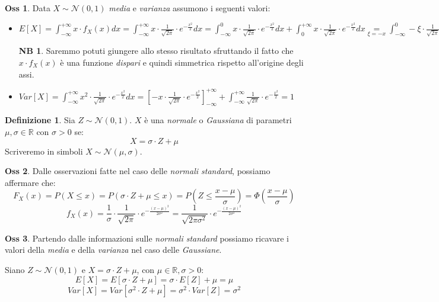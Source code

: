 \documentclass[12pt, a4paper]{report}
\theoremstyle{definition}
\newtheorem{definition}{Definizione}[section]
\newtheorem*{observation}{Oss}
\newtheorem*{note}{NB}
\DeclareRobustCommand{\R}{\mathbb{R}}%
\DeclareRobustCommand{\norm}{\mathcal{N}}
\newcommand\underrel[2]{\mathrel{\mathop{#2}\limits_{#1}}}%
\begin{document}
\begin{observation}
	Data $X\sim\norm(0,1)$ \emph{media} e \emph{varianza} assumono i seguenti valori:
	\begin{itemize}
		\item \(E[X]=\int_{-\infty}^{+\infty}x\cdot f_X(x)dx=\int_{-\infty}^{+\infty}
		x\cdot \frac{1}{\sqrt{2\pi}}\cdot e^{-\frac{x^2}{2}}dx=\int_{-\infty}^0x\cdot \frac{1}
		{\sqrt{2\pi}}\cdot e^{-\frac{x^2}{2}}dx+\int_0^{+\infty}x\cdot \frac{1}{\sqrt{2\pi}}
		\cdot e^{-\frac{x^2}{2}}dx\underrel{\xi=-x}{=}\int_{-\infty}^0 -\xi\cdot \frac{1}
		{\sqrt{2\pi}}\cdot e^{-\frac{x^2}{2}}dx+\int_0^{+\infty}x\cdot \frac{1}{\sqrt{2\pi}}
		\cdot e^{-\frac{x^2}{2}}=0\)
		\begin{note}
			Saremmo potuti giungere allo stesso risultato sfruttando il fatto che
			$x\cdot f_X(x)$ è una funzione \emph{dispari} e quindi simmetrica rispetto
			all'origine degli assi.
		\end{note}
		\item \(Var[X]=\int_{-\infty}^{+\infty}x^2\cdot \frac{1}{\sqrt{2\pi}}\cdot e^{-
		\frac{x^2}{2}}dx=\left[-x\cdot \frac{1}{\sqrt{2\pi}}\cdot e^{-\frac{x^2}{2}}\right]
		_{-\infty}^{+\infty}+\int_{-\infty}^{+\infty}\frac{1}{\sqrt{2\pi}}\cdot 
		e^{-\frac{x^2}{2}}=1\)
	\end{itemize}
\end{observation}

\begin{definition}
	Sia $Z\sim\norm(0,1)$. $X$ è una \emph{normale} o \emph{Gaussiana} di
	parametri $\mu,\sigma\in\R$ con $\sigma>0$ se:
	\[X=\sigma\cdot Z+\mu\]
	Scriveremo in simboli \(X\sim\norm(\mu, \sigma)\).
\end{definition}

\begin{observation}
	Dalle osservazioni fatte nel caso delle \emph{normali standard}, possiamo
	affermare che:
	\[F_X(x)=P(X\leq x)=P(\sigma\cdot Z+\mu\leq x)=P\left(Z\leq\frac{x-\mu}{\sigma}
	\right)=\Phi\left(\frac{x-\mu}{\sigma}\right)\]
	\[f_X(x)=\frac{1}{\sigma}\cdot \frac{1}{\sqrt{2\pi}}\cdot e^{-\frac{(x-\mu)^2}{2\sigma^2}}
	=\frac{1}{\sqrt{2\pi\sigma^2}}\cdot e^{-\frac{(x-\mu)^2}{2\sigma^2}}\]
\end{observation}

\begin{observation}
	Partendo dalle informazioni sulle \emph{normali standard} possiamo ricavare
	i valori della \emph{media} e della \emph{varianza} nel caso delle \emph{Gaussiane}.
	
	Siano $Z\sim\norm(0,1)$ e $X=\sigma\cdot Z+\mu$, con $\mu\in\R,\sigma>0$:
	\[E[X]=E[\sigma\cdot Z+\mu]=\sigma\cdot E[Z]+\mu=\mu\]
	\[Var[X]=Var[\sigma^2\cdot Z+\mu]=\sigma^2\cdot Var[Z]=\sigma^2\]
\end{observation}
\end{document}
